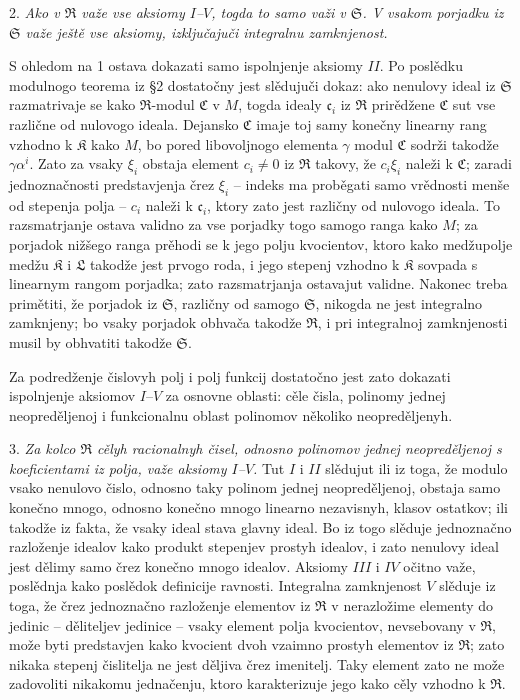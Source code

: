 \documentclass[11pt]{article}
\providecommand{\mR}{\mathfrak{R}}
\providecommand{\mK}{\mathfrak{K}}
\providecommand{\mL}{\mathfrak{L}}
\providecommand{\mS}{\mathfrak{S}}
\providecommand{\mC}{\mathfrak{C}}
\providecommand{\mc}{\mathfrak{c}}
\begin{document}
2. {\itshape Ako v $\mR$ važe vse aksiomy $I$--$V$, togda to samo važi v $\mS$. V vsakom porjadku iz $\mS$ važe ještě vse aksiomy, izključajuči integralnu zamknjenost.}

S ohledom na 1 ostava dokazati samo ispolnjenje aksiomy $II$. Po poslědku modulnogo teorema iz §2 dostatočny jest slědujuči dokaz: ako nenulovy ideal iz $\mS$ razmatrivaje se kako $\mR$-modul $\mC$ v $M$, togda idealy $\mc_i$ iz $\mR$ prirědžene $\mC$ sut vse različne od nulovogo ideala. Dejansko $\mC$ imaje toj samy konečny linearny rang vzhodno k $\mK$ kako $M$, bo pored libovoljnogo elementa $\gamma$ modul $\mC$ sodrži takodže $\gamma\alpha^i$. Zato za vsaky $\xi_i$ obstaja element $c_i\ne0$ iz $\mR$ takovy, že $c_i\xi_i$ naleži k $\mC$; zaradi jednoznačnosti predstavjenja črez $\xi_i$ -- indeks ma proběgati samo vrědnosti menše od stepenja polja -- $c_i$ naleži k $\mc_i$, ktory zato jest različny od nulovogo ideala. To razsmatrjanje ostava validno za vse porjadky togo samogo ranga kako $M$; za porjadok nižšego ranga prěhodi se k jego polju kvocientov, ktoro kako medžupolje medžu $\mK$ i $\mL$ takodže jest prvogo roda, i jego stepenj vzhodno k $\mK$ sovpada s linearnym rangom porjadka; zato razsmatrjanja ostavajut validne. Nakonec treba primětiti, že porjadok iz $\mS$, različny od samogo $\mS$, nikogda ne jest integralno zamknjeny; bo vsaky porjadok obhvača takodže $\mR$, i pri integralnoj zamknjenosti musil by obhvatiti takodže $\mS$.

Za podredženje čislovyh polj i polj funkcij dostatočno jest zato dokazati ispolnjenje aksiomov $I$--$V$ za osnovne oblasti: cěle čisla, polinomy jednej neopreděljenoj i funkcionalnu oblast polinomov několiko neopreděljenyh.

3. {\itshape Za kolco $\mR$ cělyh racionalnyh čisel, odnosno polinomov jednej neopreděljenoj s koeficientami iz polja, važe aksiomy $I$--$V$.} Tut $I$ i $II$ slědujut ili iz toga, že modulo vsako nenulovo čislo, odnosno taky polinom jednej neopreděljenoj, obstaja samo konečno mnogo, odnosno konečno mnogo linearno nezavisnyh, klasov ostatkov; ili takodže iz fakta, že vsaky ideal stava glavny ideal. Bo iz togo slěduje jednoznačno razloženje idealov kako produkt stepenjev prostyh idealov, i zato nenulovy ideal jest dělimy samo črez konečno mnogo idealov. Aksiomy $III$ i $IV$ očitno važe, poslědnja kako poslědok definicije ravnosti. Integralna zamknjenost $V$ slěduje iz toga, že črez jednoznačno razloženje elementov iz $\mR$ v nerazložime elementy do jedinic -- děliteljev jedinice -- vsaky element polja kvocientov, nevsebovany v $\mR$, može byti predstavjen kako kvocient dvoh vzaimno prostyh elementov iz $\mR$; zato nikaka stepenj čislitelja ne jest děljiva črez imenitelj. Taky element zato ne može zadovoliti nikakomu jednačenju, ktoro karakterizuje jego kako cěly vzhodno k $\mR$.
\end{document}
